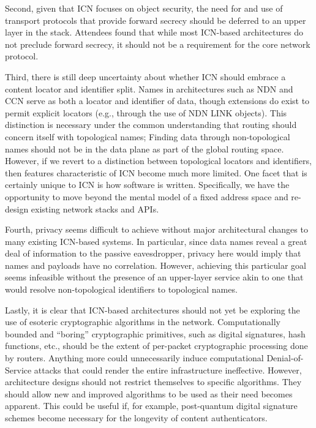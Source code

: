 \documentclass[a4paper,UKenglish]{dagrep}
\begin{document}
Second, given that ICN focuses on object security, the need for and use of transport protocols that provide forward secrecy should be deferred to an upper layer in the stack. Attendees found that while most ICN-based architectures do not preclude forward secrecy, it should not be a requirement for the core network protocol. 

Third, there is still deep uncertainty about whether ICN should embrace a content locator and identifier split. Names in architectures such as NDN and CCN serve as both a locator and identifier of data, though extensions do exist to permit explicit locators (e.g., through the use of NDN LINK objects). This distinction is necessary under the common understanding that routing should concern itself with topological names; Finding data through non-topological names should not be in the data plane as part of the global routing space. However, if we revert to a distinction between topological locators and identifiers, then features characteristic of ICN become much more limited. One facet that is certainly unique to ICN is how software is written. Specifically, we have the opportunity to move beyond the mental model of a fixed address space and re-design existing network stacks and APIs. 

Fourth, privacy seems difficult to achieve without major architectural changes to many existing ICN-based systems. In particular, since data names reveal a great deal of information to the passive eavesdropper, privacy here would imply that names and payloads have no correlation. However, achieving this particular goal seems infeasible without the presence of an upper-layer service akin to one that would resolve non-topological identifiers to topological names. 

Lastly, it is clear that ICN-based architectures should not yet be exploring the use of esoteric cryptographic algorithms in the network. Computationally bounded and ``boring'' cryptographic primitives, such as digital signatures, hash functions, etc., should be the extent of per-packet cryptographic processing done by routers. Anything more could unnecessarily induce computational Denial-of-Service attacks that could render the entire infrastructure ineffective. However, architecture designs should not restrict themselves to specific algorithms. They should allow new and improved algorithms to be used as their need becomes apparent. This could be useful if, for example, post-quantum digital signature schemes become necessary for the longevity of content authenticators. 
\end{document}
